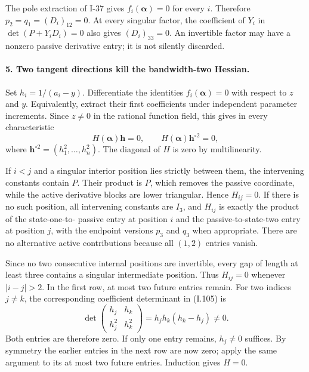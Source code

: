 The pole extraction of I-37 gives $f_i(\boldsymbol\alpha)=0$
for every $i$. Therefore $p_2=q_1=(D_i)_{12}=0$. At every
singular factor, the coefficient of $Y_i$ in
$\det(P+Y_iD_i)=0$ also gives $(D_i)_{33}=0$. An invertible
factor may have a nonzero passive derivative entry; it is not
silently discarded.

\paragraph{5. Two tangent directions kill the bandwidth-two Hessian.}
Set $h_i=1/(a_i-y)$. Differentiate the identities
$f_i(\boldsymbol\alpha)=0$ with respect to $z$ and $y$.
Equivalently, extract their first coefficients under independent
parameter increments. Since $z\ne0$ in the rational function
field, this gives in every characteristic
\[
 H(\boldsymbol\alpha)\mathbf h=0,
 \qquad H(\boldsymbol\alpha)\mathbf h^{\circ2}=0,
 \tag{I.105}
\]
where $\mathbf h^{\circ2}=(h_1^2,\ldots,h_n^2)$. The diagonal
of $H$ is zero by multilinearity.

If $i<j$ and a singular interior position lies strictly between
them, the intervening constants contain $P$. Their product
is $P$, which removes the passive coordinate, while the active
derivative blocks are lower triangular. Hence $H_{ij}=0$.
If there is no such position, all intervening constants are
$I_3$, and $H_{ij}$ is exactly the product of the state-one-to-
passive entry at position $i$ and the passive-to-state-two
entry at position $j$, with the endpoint versions $p_3$ and
$q_3$ when appropriate. There are no alternative active
contributions because all $(1,2)$ entries vanish.

Since no two consecutive internal positions are invertible,
every gap of length at least three contains a singular
intermediate position. Thus $H_{ij}=0$ whenever $|i-j|>2$.
In the first row, at most two future entries remain. For two
indices $j\ne k$, the corresponding coefficient determinant
in (I.105) is
\[
 \det\begin{pmatrix}h_j&h_k\\h_j^2&h_k^2\end{pmatrix}
 =h_jh_k(h_k-h_j)\ne0.
 \tag{I.106}
\]
Both entries are therefore zero. If only one entry remains,
$h_j\ne0$ suffices. By symmetry the earlier entries in the
next row are now zero; apply the same argument to its at most
two future entries. Induction gives $H=0$.

